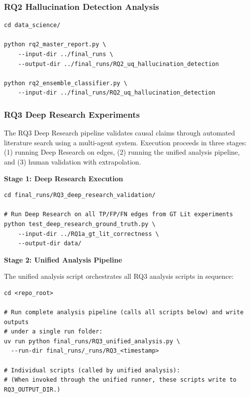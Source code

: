 \subsubsection{RQ2 Hallucination Detection Analysis}

\begin{verbatim}
cd data_science/

python rq2_master_report.py \
    --input-dir ../final_runs \
    --output-dir ../final_runs/RQ2_uq_hallucination_detection

python rq2_ensemble_classifier.py \
    --input-dir ../final_runs/RQ2_uq_hallucination_detection
\end{verbatim}

\subsubsection{RQ3 Deep Research Experiments}
\label{sec:rq3_execution}

The RQ3 Deep Research pipeline validates causal claims through automated literature search using a multi-agent system. Execution proceeds in three stages: (1) running Deep Research on edges, (2) running the unified analysis pipeline, and (3) human validation with extrapolation.

\textbf{Stage 1: Deep Research Execution}

\begin{verbatim}
cd final_runs/RQ3_deep_research_validation/

# Run Deep Research on all TP/FP/FN edges from GT Lit experiments
python test_deep_research_ground_truth.py \
    --input-dir ../RQ1a_gt_lit_correctness \
    --output-dir data/
\end{verbatim}

\textbf{Stage 2: Unified Analysis Pipeline}

The unified analysis script orchestrates all RQ3 analysis scripts in sequence:

\begin{verbatim}
cd <repo_root>

# Run complete analysis pipeline (calls all scripts below) and write outputs
# under a single run folder:
uv run python final_runs/RQ3_unified_analysis.py \
  --run-dir final_runs/_runs/RQ3_<timestamp>

# Individual scripts (called by unified analysis):
# (When invoked through the unified runner, these scripts write to RQ3_OUTPUT_DIR.)
\end{verbatim}

